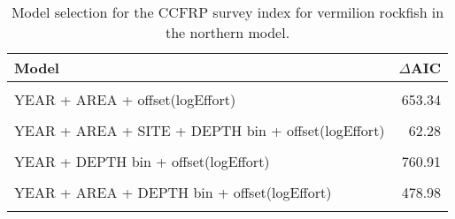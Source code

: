 \documentclass[
]{article}
\begin{document}
\begin{table}

\caption{\label{tab:tab-model-select-ccfrp}Model selection for the CCFRP survey index for vermilion rockfish in the northern model.}
\centering
\begin{tabular}[t]{lr}
\toprule
Model & $\Delta$AIC\\
\midrule
\cellcolor{gray!6}{1 + offset(logEffort)} & \cellcolor{gray!6}{1191.26}\\
YEAR + AREA + offset(logEffort) & 653.34\\
\cellcolor{gray!6}{YEAR + AREA + SITE + offset(logEffort)} & \cellcolor{gray!6}{188.88}\\
YEAR + AREA + SITE + DEPTH bin + offset(logEffort) & 62.28\\
\cellcolor{gray!6}{YEAR + SITE + offset(logEffort)} & \cellcolor{gray!6}{579.86}\\
\addlinespace
YEAR + DEPTH bin + offset(logEffort) & 760.91\\
\cellcolor{gray!6}{YEAR + SITE + DEPTH bin + offset(logEffort)} & \cellcolor{gray!6}{397.53}\\
YEAR + AREA + DEPTH bin + offset(logEffort) & 478.98\\
\cellcolor{gray!6}{YEAR + AREA + SITE + DEPTH bin + YEAR:SITE + offset(logEffort)} & \cellcolor{gray!6}{0.00}\\
\bottomrule
\end{tabular}
\end{table}

\FloatBarrier
\end{document}
